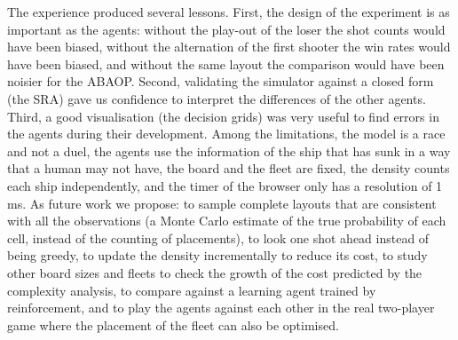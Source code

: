 \documentclass[letterpaper,11pt]{article} %
\begin{document}
The experience produced several lessons. First, the design of the experiment is as important as the agents: without the play-out of the loser the shot counts would have been biased, without the alternation of the first shooter the win rates would have been biased, and without the same layout the comparison would have been noisier for the ABAOP. Second, validating the simulator against a closed form (the SRA) gave us confidence to interpret the differences of the other agents. Third, a good visualisation (the decision grids) was very useful to find errors in the agents during their development.
Among the limitations, the model is a race and not a duel, the agents use the information of the ship that has sunk in a way that a human may not have, the board and the fleet are fixed, the density counts each ship independently, and the timer of the browser only has a resolution of 1 ms.
As future work we propose: to sample complete layouts that are consistent with all the observations (a Monte Carlo estimate of the true probability of each cell, instead of the counting of placements), to look one shot ahead instead of being greedy, to update the density incrementally to reduce its cost, to study other board sizes and fleets to check the growth of the cost predicted by the complexity analysis, to compare against a learning agent trained by reinforcement, and to play the agents against each other in the real two-player game where the placement of the fleet can also be optimised.
\end{document}
